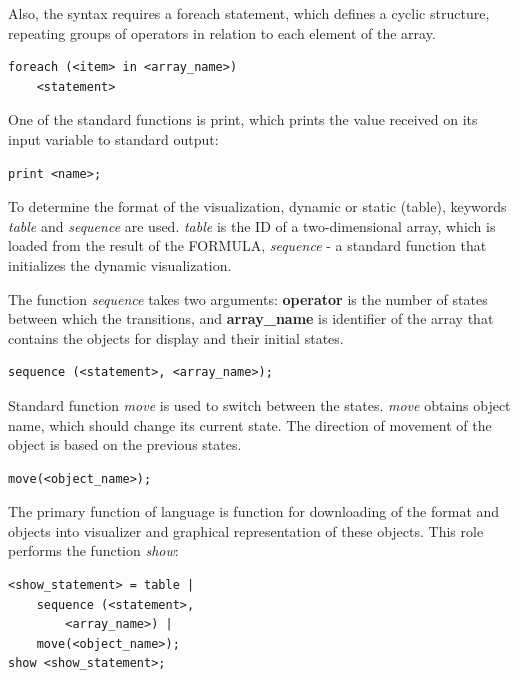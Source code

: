 \documentclass[a4paper, 10pt, conference]{ieeeconf}
\begin{document}
Also, the syntax requires a foreach statement, which defines a cyclic structure, repeating groups of operators in relation to each element of the array.
\begin{lstlisting}
foreach (<item> in <array_name>)
	<statement>
\end{lstlisting}

One of the standard functions is print, which prints the value received on its input variable to standard output:
\begin{lstlisting}
print <name>;
\end{lstlisting}

To determine the format of the visualization, dynamic or static (table), keywords \textit{table} and \textit{sequence} are used. \textit{table} is the ID of a two-dimensional array, which is loaded from the result of the FORMULA, \textit{sequence} - a standard function that initializes the dynamic visualization.

The function \textit{sequence} takes two arguments:
\textbf{operator} is the number of states between which the transitions, and \textbf{array\_name} is identifier of the array that contains the objects for display and their initial states.
\begin{lstlisting}
sequence (<statement>, <array_name>);
\end{lstlisting}

Standard function \textit{move} is used to switch between the states. \textit{move} obtains object name, which should change its current state. The direction of movement of the object is based on the previous states.
\begin{lstlisting}
move(<object_name>);
\end{lstlisting}

The primary function of language is function for downloading of the format and objects into visualizer and graphical representation of these objects. This role performs the function \textit{show}:
\begin{lstlisting}
<show_statement> = table |
	sequence (<statement>,
		<array_name>) |
	move(<object_name>);
show <show_statement>;
\end{lstlisting}
\end{document}

